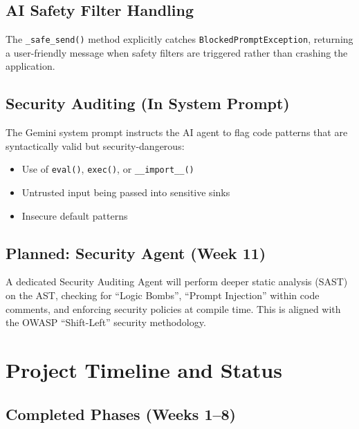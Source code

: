 \documentclass[a4paper,11pt]{article}
\begin{document}
\subsection{AI Safety Filter Handling}

The \texttt{\_safe\_send()} method explicitly catches \texttt{BlockedPromptException}, returning a user-friendly message when safety filters are triggered rather than crashing the application.

\subsection{Security Auditing (In System Prompt)}

The Gemini system prompt instructs the AI agent to flag code patterns that are syntactically valid but security-dangerous:
\begin{itemize}
    \item Use of \texttt{eval()}, \texttt{exec()}, or \texttt{\_\_import\_\_()}
    \item Untrusted input being passed into sensitive sinks
    \item Insecure default patterns
\end{itemize}

\subsection{Planned: Security Agent (Week 11)}

A dedicated Security Auditing Agent will perform deeper static analysis (SAST) on the AST, checking for ``Logic Bombs'', ``Prompt Injection'' within code comments, and enforcing security policies at compile time. This is aligned with the OWASP ``Shift-Left'' security methodology.


\section{Project Timeline and Status}

\subsection{Completed Phases (Weeks 1--8)}
\end{document}
